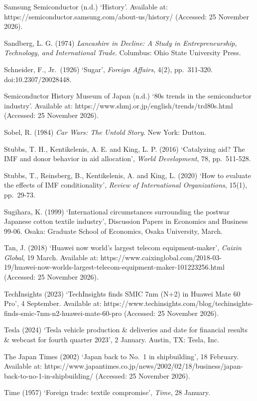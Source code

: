 Samsung Semiconductor (n.d.) `History'. Available at:
https://semiconductor.samsung.com/about-us/history/ (Accessed: 25
November 2026).

Sandberg, L. G. (1974) \emph{Lancashire in Decline: A Study in
Entrepreneurship, Technology, and International Trade}. Columbus: Ohio
State University Press.

Schneider, F., Jr.~(1926) `Sugar', \emph{Foreign Affairs}, 4(2),
pp.~311-320. doi:10.2307/20028448.

Semiconductor History Museum of Japan (n.d.) `80s trends in the
semiconductor industry'. Available at:
https://www.shmj.or.jp/english/trends/trd80s.html (Accessed: 25 November
2026).

Sobel, R. (1984) \emph{Car Wars: The Untold Story}. New York: Dutton.

Stubbs, T. H., Kentikelenis, A. E. and King, L. P. (2016) `Catalyzing
aid? The IMF and donor behavior in aid allocation', \emph{World
Development}, 78, pp.~511-528.

Stubbs, T., Reinsberg, B., Kentikelenis, A. and King, L. (2020) `How to
evaluate the effects of IMF conditionality', \emph{Review of
International Organizations}, 15(1), pp.~29-73.

Sugihara, K. (1999) `International circumstances surrounding the postwar
Japanese cotton textile industry', Discussion Papers in Economics and
Business 99-06. Osaka: Graduate School of Economics, Osaka University,
March.

Tan, J. (2018) `Huawei now world's largest telecom equipment-maker',
\emph{Caixin Global}, 19 March. Available at:
https://www.caixinglobal.com/2018-03-19/huawei-now-worlds-largest-telecom-equipment-maker-101223256.html
(Accessed: 25 November 2026).

TechInsights (2023) `TechInsights finds SMIC 7nm (N+2) in Huawei Mate 60
Pro', 4 September. Available at:
https://www.techinsights.com/blog/techinsights-finds-smic-7nm-n2-huawei-mate-60-pro
(Accessed: 25 November 2026).

Tesla (2024) `Tesla vehicle production \& deliveries and date for
financial results \& webcast for fourth quarter 2023', 2 January.
Austin, TX: Tesla, Inc.

The Japan Times (2002) `Japan back to No.~1 in shipbuilding', 18
February. Available at:
https://www.japantimes.co.jp/news/2002/02/18/business/japan-back-to-no-1-in-shipbuilding/
(Accessed: 25 November 2026).

Time (1957) `Foreign trade: textile compromise', \emph{Time}, 28
January.

